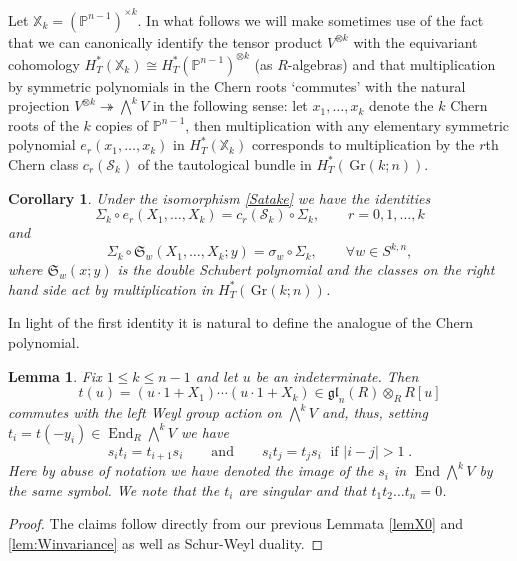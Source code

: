 \documentclass[12pt]{amsart}
\newcommand{\cS}{\mathcal{S}}
\newcommand{\Gr}{\,\mathrm{Gr}}
\newcommand{\fS}{\mathfrak{S}}
\newcommand{\End}{\operatorname{End}}
\newcommand{\mb}[1]{\mathbb{#1}}
\newcommand{\ring}{R}
\newtheorem{cor}[prop]{Corollary}
\newtheorem{lemma}[prop]{Lemma}
\numberwithin{equation}{section}
\numberwithin{figure}{section}
\newcommand{\gl}{\mathfrak{gl}}
\begin{document}
Let $\mb{X}_k=(\mb{P}^{n-1})^{\times k}$. In what follows we will make sometimes use of the fact that we can canonically identify the tensor product $V^{\otimes k}$ with the equivariant cohomology $H^*_T(\mb{X}_k)\cong H_T^*(\mb{P}^{n-1})^{\otimes k}$ (as $\ring$-algebras) and that multiplication by symmetric polynomials in the Chern roots `commutes' with the natural projection $V^{\otimes k}\twoheadrightarrow\bigwedge^kV$ in the following sense: let $x_1,\ldots,x_k$ denote the $k$ Chern roots of the $k$ copies of $\mb{P}^{n-1}$, then multiplication with any elementary symmetric polynomial $e_r(x_1,\ldots,x_k)$ in $H^*_T(\mb{X}_k)$ corresponds to multiplication by the $r$th Chern class $c_r(\cS_k)$ of the tautological bundle in $H^*_T(\Gr(k;n))$.
\begin{cor}
    Under the isomorphism \eqref{Satake} we have the identities
    \begin{equation}
    \Sigma_k\circ e_r(X_1,\ldots,X_k)=c_r(\cS_k)\circ\Sigma_k,
    \qquad r=0,1,\ldots,k
    \end{equation}
    and 
    \begin{equation}
    \Sigma_k\circ \fS_w(X_1,\ldots,X_k;y)=\sigma_w\circ\Sigma_k,\qquad
    \forall w\in S^{k,n},
    \end{equation}
    where $\fS_w(x;y)$ is the double Schubert polynomial and the classes on the right hand side act by multiplication in $H^*_T(\Gr(k;n))$.
\end{cor}
In light of the first identity it is natural to define the analogue of the Chern polynomial.
\begin{lemma}\label{lem:transfermatrix}
Fix $1\le k\le n-1$ and let $u$ be an indeterminate. Then
\[
t(u)=(u\cdot 1+X_1)\cdots (u\cdot 1+X_k)\in\gl_n(\ring)\otimes_\ring\ring[u]
\]
commutes with the left Weyl group action on $\bigwedge^kV$ and, thus, setting $t_i=t(-y_i)\in\End_{\ring} \bigwedge^kV$ we have
\begin{equation}
s_it_i=t_{i+1}s_i\qquad\text{and}\qquad s_it_j=t_js_i\;\text{ if }|i-j|>1\;.
\end{equation}
Here by abuse of notation we have denoted the image of the $s_i$ in $\End \bigwedge^kV$ by the same symbol. We note that the $t_i$ are singular and that $t_1t_2\ldots t_n=0$.
\end{lemma}
\begin{proof}
    The claims follow directly from our previous Lemmata \ref{lemX0} and  \ref{lem:Winvariance} as well as Schur-Weyl duality.
\end{proof}
\end{document}
